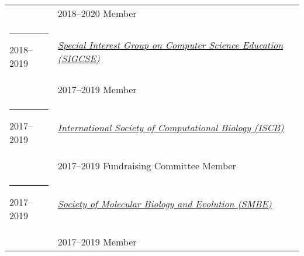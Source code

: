 \documentclass[margin,line]{res}
\begin{document}
\begin{resume}
\begin{longtable}{@{}p{0.7in}p{4in}}
\hspace*{-4mm} & \hspace{4mm} 2018--2020 Member\\
\hspace*{-4mm} \rule{-1mm}{5mm} 2018--2019 & \href{https://sigcse.org/}{\textit{Special Interest Group on Computer Science Education (SIGCSE)}}\\*
\hspace*{-4mm} & \hspace{4mm} 2017--2019 Member\\
\hspace*{-4mm} \rule{-1mm}{5mm} 2017--2019 & \href{https://www.iscb.org/}{\textit{International Society of Computational Biology (ISCB)}}\\*
\hspace*{-4mm} & \hspace{4mm} 2017--2019 Fundraising Committee Member\\
\hspace*{-4mm} \rule{-1mm}{5mm} 2017--2019 & \href{http://www.smbe.org/}{\textit{Society of Molecular Biology and Evolution (SMBE)}}\\*
\hspace*{-4mm} & \hspace{4mm} 2017--2019 Member\\
\end{longtable}


\end{resume}
\end{document}
